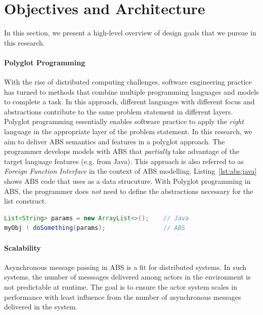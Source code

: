 \section{Objectives and Architecture}
\label{sec:intro:arch:crit}

In this section, we present a high-level overview of design goals that we pursue in this research. 

\paragraph{Polyglot Programming}
With the rise of distributed computing challenges, software engineering practice has turned to methods that combine multiple programming languages and models to complete a task. 
In this approach, different languages with different focus and abstractions contribute to the same problem statement in different layers. 
Polyglot programming essentially enables software practice to apply the \emph{right} language in the appropriate layer of the problem statement. 
In this research, we aim to deliver ABS semantics and features in a polyglot approach. 
The programmer develops models with ABS that \emph{partially} take advantage of the target language features (e.g. from Java).
This approach is also referred to as \emph{Foreign Function Interface} in the context of ABS modelling.
Listing~\ref{lst:abs:java} shows ABS code that uses  as a data strucuture.
With Polyglot programming in ABS, the programmer does \emph{not} need to define the abstractions necessary for the list construct. 

\begin{lstlisting}[float=h,language=Java,caption=Using Java in ABS,label=lst:abs:java]
List<String> params = new ArrayList<>();    // Java
myObj ! doSomething(params);                // ABS
\end{lstlisting}

\paragraph{Scalability} 
Asynchronous message passing in ABS is a fit for distributed systems.
In such systems, the number of messsages delivered among actors in the 
environment is not predictable at runtime.
The goal is to ensure the actor system scales in performance with least 
influence from the number of asynchronous messages delivered in the system.

